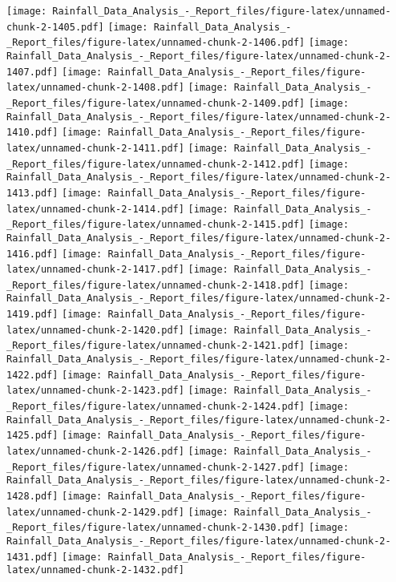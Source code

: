 \documentclass[
]{article}
\begin{document}
\texttt{[image: Rainfall\_Data\_Analysis\_-\_Report\_files/figure-latex/unnamed-chunk-2-1405.pdf]}
\texttt{[image: Rainfall\_Data\_Analysis\_-\_Report\_files/figure-latex/unnamed-chunk-2-1406.pdf]}
\texttt{[image: Rainfall\_Data\_Analysis\_-\_Report\_files/figure-latex/unnamed-chunk-2-1407.pdf]}
\texttt{[image: Rainfall\_Data\_Analysis\_-\_Report\_files/figure-latex/unnamed-chunk-2-1408.pdf]}
\texttt{[image: Rainfall\_Data\_Analysis\_-\_Report\_files/figure-latex/unnamed-chunk-2-1409.pdf]}
\texttt{[image: Rainfall\_Data\_Analysis\_-\_Report\_files/figure-latex/unnamed-chunk-2-1410.pdf]}
\texttt{[image: Rainfall\_Data\_Analysis\_-\_Report\_files/figure-latex/unnamed-chunk-2-1411.pdf]}
\texttt{[image: Rainfall\_Data\_Analysis\_-\_Report\_files/figure-latex/unnamed-chunk-2-1412.pdf]}
\texttt{[image: Rainfall\_Data\_Analysis\_-\_Report\_files/figure-latex/unnamed-chunk-2-1413.pdf]}
\texttt{[image: Rainfall\_Data\_Analysis\_-\_Report\_files/figure-latex/unnamed-chunk-2-1414.pdf]}
\texttt{[image: Rainfall\_Data\_Analysis\_-\_Report\_files/figure-latex/unnamed-chunk-2-1415.pdf]}
\texttt{[image: Rainfall\_Data\_Analysis\_-\_Report\_files/figure-latex/unnamed-chunk-2-1416.pdf]}
\texttt{[image: Rainfall\_Data\_Analysis\_-\_Report\_files/figure-latex/unnamed-chunk-2-1417.pdf]}
\texttt{[image: Rainfall\_Data\_Analysis\_-\_Report\_files/figure-latex/unnamed-chunk-2-1418.pdf]}
\texttt{[image: Rainfall\_Data\_Analysis\_-\_Report\_files/figure-latex/unnamed-chunk-2-1419.pdf]}
\texttt{[image: Rainfall\_Data\_Analysis\_-\_Report\_files/figure-latex/unnamed-chunk-2-1420.pdf]}
\texttt{[image: Rainfall\_Data\_Analysis\_-\_Report\_files/figure-latex/unnamed-chunk-2-1421.pdf]}
\texttt{[image: Rainfall\_Data\_Analysis\_-\_Report\_files/figure-latex/unnamed-chunk-2-1422.pdf]}
\texttt{[image: Rainfall\_Data\_Analysis\_-\_Report\_files/figure-latex/unnamed-chunk-2-1423.pdf]}
\texttt{[image: Rainfall\_Data\_Analysis\_-\_Report\_files/figure-latex/unnamed-chunk-2-1424.pdf]}
\texttt{[image: Rainfall\_Data\_Analysis\_-\_Report\_files/figure-latex/unnamed-chunk-2-1425.pdf]}
\texttt{[image: Rainfall\_Data\_Analysis\_-\_Report\_files/figure-latex/unnamed-chunk-2-1426.pdf]}
\texttt{[image: Rainfall\_Data\_Analysis\_-\_Report\_files/figure-latex/unnamed-chunk-2-1427.pdf]}
\texttt{[image: Rainfall\_Data\_Analysis\_-\_Report\_files/figure-latex/unnamed-chunk-2-1428.pdf]}
\texttt{[image: Rainfall\_Data\_Analysis\_-\_Report\_files/figure-latex/unnamed-chunk-2-1429.pdf]}
\texttt{[image: Rainfall\_Data\_Analysis\_-\_Report\_files/figure-latex/unnamed-chunk-2-1430.pdf]}
\texttt{[image: Rainfall\_Data\_Analysis\_-\_Report\_files/figure-latex/unnamed-chunk-2-1431.pdf]}
\texttt{[image: Rainfall\_Data\_Analysis\_-\_Report\_files/figure-latex/unnamed-chunk-2-1432.pdf]}
\end{document}
